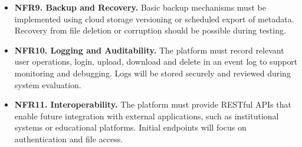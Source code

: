 \begin{itemize}
    \item \textbf{NFR9. Backup and Recovery.}
    Basic backup mechanisms must be implemented using cloud storage versioning or scheduled export of metadata. Recovery from file deletion or corruption should be possible during testing.

    \item \textbf{NFR10. Logging and Auditability.}
    The platform must record relevant user operations, login, upload, download and delete in an event log to support monitoring and debugging. Logs will be stored securely and reviewed during system evaluation.

    \item \textbf{NFR11. Interoperability.}
    The platform must provide RESTful APIs that enable future integration with external applications, such as institutional systems or educational platforms. Initial endpoints will focus on authentication and file access.
\end{itemize}
